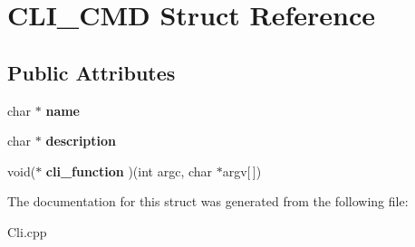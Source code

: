 \hypertarget{struct_c_l_i___c_m_d}{}\section{C\+L\+I\+\_\+\+C\+MD Struct Reference}
\label{struct_c_l_i___c_m_d}
\subsection*{Public Attributes}
\begin{DoxyCompactItemize}
\item 
char $\ast$ {\bfseries name}\hypertarget{struct_c_l_i___c_m_d_a5f39e41350d81af8874be20b3b3176bb}{}\label{struct_c_l_i___c_m_d_a5f39e41350d81af8874be20b3b3176bb}

\item 
char $\ast$ {\bfseries description}\hypertarget{struct_c_l_i___c_m_d_a5f33c0328c48a1b161c3b0c987be76b5}{}\label{struct_c_l_i___c_m_d_a5f33c0328c48a1b161c3b0c987be76b5}

\item 
void($\ast$ {\bfseries cli\+\_\+function} )(int argc, char $\ast$argv\mbox{[}$\,$\mbox{]})\hypertarget{struct_c_l_i___c_m_d_acf3ac800d6772d49baa49a0a944f918e}{}\label{struct_c_l_i___c_m_d_acf3ac800d6772d49baa49a0a944f918e}

\end{DoxyCompactItemize}


The documentation for this struct was generated from the following file\+:\begin{DoxyCompactItemize}
\item 
Cli.\+cpp\end{DoxyCompactItemize}
